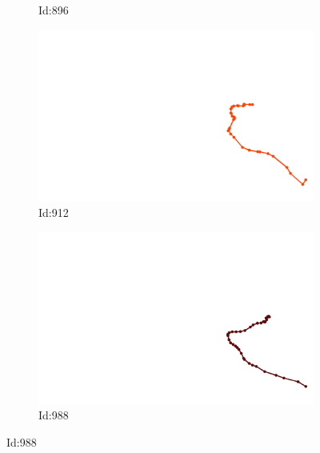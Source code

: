 \documentclass[12pt,twoside]{report}
\begin{document}
\begin{figure}
\begin{subfigure}[b]{0.20\textwidth}
\caption{Id:896}
\end{subfigure}
\begin{subfigure}[b]{0.20\textwidth}
\centering
\includegraphics[width=\textwidth]{../../trajectories/912.png}
\caption{Id:912}
\end{subfigure}
\begin{subfigure}[b]{0.20\textwidth}
\centering
\includegraphics[width=\textwidth]{../../trajectories/988.png}
\caption{Id:988}
\end{subfigure}
\end{figure}
\end{document}
